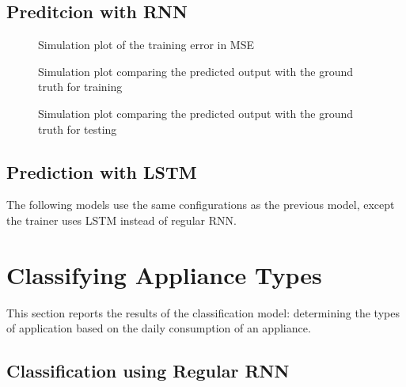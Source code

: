 \documentclass[a4paper, article, oneside, USenglish, IN5460]{memoir}
\begin{document}
\section{Preditcion with RNN}

\begin{figure}[h]
  \centering
  \caption{Simulation plot of the training error in MSE}
\end{figure}

\begin{figure}[h]
  \centering
  \caption{Simulation plot comparing the predicted output with the ground truth for training}
\end{figure}

\begin{figure}[h]
  \centering
  \caption{Simulation plot comparing the predicted output with the ground truth for testing}
\end{figure}




\section{Prediction with LSTM}

The following models use the same configurations as the previous model, except the trainer uses LSTM instead of regular RNN.


\chapter{Classifying Appliance Types}

This section reports the results of the classification model: determining the types of application based on the daily consumption of an appliance.

\section{Classification using Regular RNN}

\end{document}
